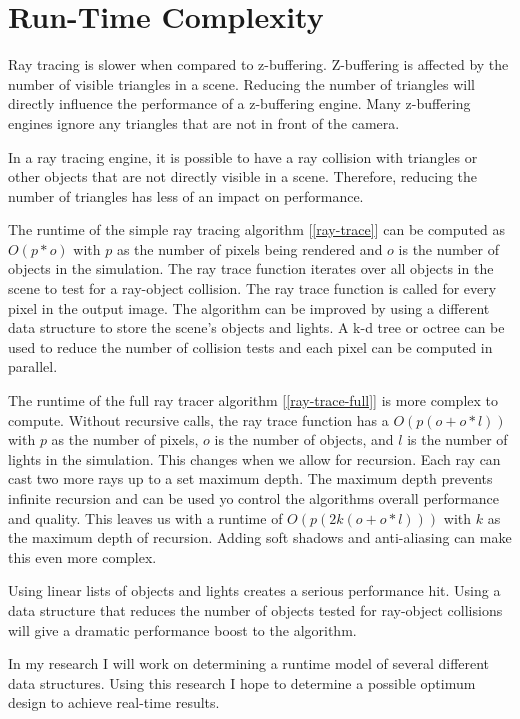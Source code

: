 \section{Run-Time Complexity}
Ray tracing is slower when compared to z-buffering.  Z-buffering is affected by the number of visible triangles in a scene.  Reducing the number of triangles will directly influence the performance of a z-buffering engine.  Many z-buffering engines ignore any triangles that are not in front of the camera.

In a ray tracing engine, it is possible to have a ray collision with triangles or other objects that are not directly visible in a scene.  Therefore, reducing the number of triangles has less of an impact on performance.

The runtime of the simple ray tracing algorithm [\ref{ray-trace}] can be computed as $O(p*o)$ with $p$ as the number of pixels being rendered and $o$ is the number of objects in the simulation.    The ray trace function iterates over all objects in the scene to test for a ray-object collision.  The ray trace function is called for every pixel in the output image.   The algorithm can be improved by using a different data structure to store the scene's objects and lights.  A k-d tree or octree can be used to reduce the number of collision tests and each pixel can be computed in parallel.

The runtime of the full ray tracer algorithm [\ref{ray-trace-full}] is more complex to compute.  Without recursive calls, the ray trace function has a $O( p(o + o*l ))$ with $p$ as the number of pixels, $o$ is the number of objects, and $l$ is the number of lights in the simulation.  This changes when we allow for recursion.  Each ray can cast two more rays up to a set maximum depth.  The maximum depth prevents infinite recursion and can be used yo control the algorithms overall performance and quality.  This leaves us with a runtime of $O( p( 2k( o +o*l )))$ with $k$ as the maximum depth of recursion.   Adding soft shadows and anti-aliasing can make this even more complex.

Using linear lists of objects and lights creates a serious performance hit.  Using a data structure that reduces the number of objects tested for ray-object collisions will give a dramatic performance boost to the algorithm.

In my research I will work on determining a runtime model of several different data structures.  Using this research I hope to determine a possible optimum design to achieve real-time results. 
